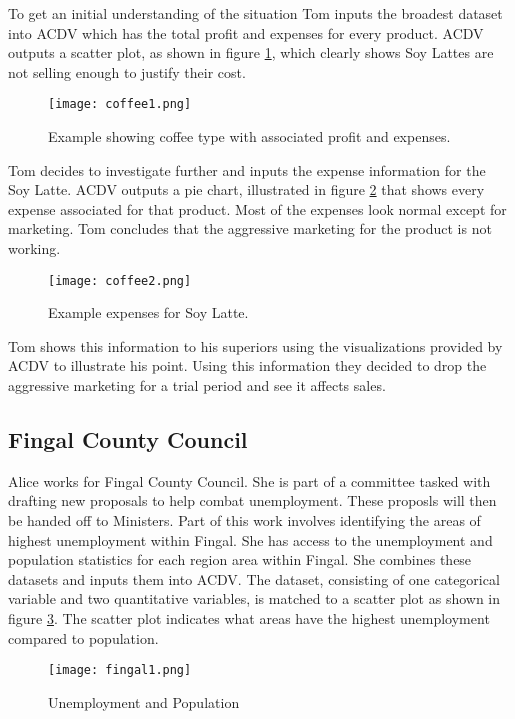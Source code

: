 \documentclass[a4paper, 11pt, titlepage, onehalfspacing]{report}
\begin{document}
To get an initial understanding of the situation Tom inputs the broadest dataset into AC\lightning{}DV which has the total profit and expenses for every product. AC\lightning{}DV outputs a scatter plot, as shown in figure \ref{coffee1}, which clearly shows Soy Lattes are not selling enough to justify their cost. 

\begin{figure}[htp] \centering
\texttt{[image: coffee1.png]}
\caption{Example showing coffee type with associated profit and expenses.}
\label{coffee1}
\end{figure}

Tom decides to investigate further and inputs the expense information for the Soy Latte. AC\lightning{}DV outputs a pie chart, illustrated in figure \ref{coffeepie} that shows every expense associated for that product. Most of the expenses look normal except for marketing. Tom concludes that the aggressive marketing for the product is not working. 

\begin{figure}[htp] \centering
\texttt{[image: coffee2.png]}
\caption{Example expenses for Soy Latte.}
\label{coffeepie}
\end{figure}

Tom shows this information to his superiors using the visualizations provided by AC\lightning{}DV to illustrate his point. Using this information they decided to drop the aggressive marketing for a trial period and see it affects sales.
\subsection{Fingal County Council}

Alice works for Fingal County Council. She is part of a committee tasked with drafting new proposals to help combat unemployment. These proposls will then be handed off to Ministers. Part of this work involves identifying the areas of highest unemployment within Fingal. She has access to the unemployment and population statistics for each region area within Fingal. She combines these datasets and inputs them into AC\lightning{}DV. The dataset, consisting of one categorical variable and two quantitative variables, is matched to a scatter plot as shown in figure \ref{fingal1}. The scatter plot indicates what areas have the highest unemployment compared to population. 

\begin{figure}[htp] \centering
\texttt{[image: fingal1.png]}
\caption{Unemployment and Population}
\label{fingal1}
\end{figure}
\end{document}

